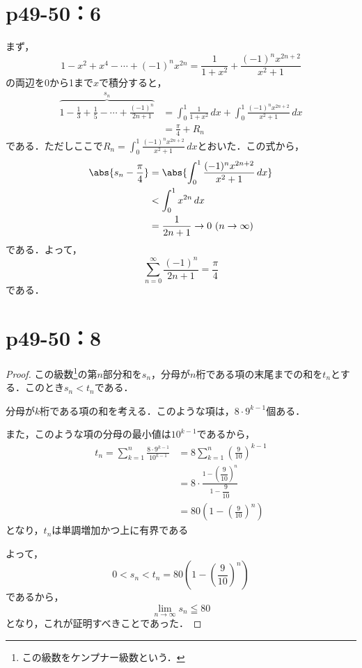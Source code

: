 \documentclass[a4paper,10pt,fleqn]{ltjsarticle}
\begin{document}
    \section*{p49-50：6}
    \begin{tleftbar}
        まず，
        \[
             1-x^2+x^4-\cdots+(-1)^n x^{2n} =\frac{1}{1+x^2} +\frac{(-1)^n x^{2n+2}}{x^2+1}
        \]
    の両辺を0から1まで$x$で積分すると，
    \begin{align*}
       \overbrace{1-\frac{1}{3}+\frac{1}{5}-\cdots+\frac{(-1)^n}{2n+1}}^{s_n} &=\int_{0}^{1} \frac{1}{1+x^2} \, dx +\int_{0}^{1}\frac{(-1)^n x^{2n+2}}{x^2+1}  \, dx \\
    & = \frac{\pi}{4} + R_n
    \end{align*}
    である．ただしここで$R_n =\int_{0}^{1}\frac{(-1)^n x^{2n+2}}{x^2+1} \, dx$とおいた．この式から，
    \begin{align*}
      \abs{s_n -\frac{\pi}{4}  } & = \abs{\int_{0}^{1}\frac{(-1)^n x^{2n+2}}{x^2+1} \, dx } \\
       & < \int_{0}^{1} x^{2n} \, dx \\
       & =\frac{1}{2n+1} \to 0 ~(n \to \infty)
    \end{align*}
    である．よって，
    \[
        \sum_{n=0}^{\infty} \frac{(-1)^n}{2n+1} =\frac{\pi}{4}
    \]
    である．
    \end{tleftbar}

    \newpage 

    \section*{p49-50：8}

    \begin{tleftbar}
        \begin{proof}
        この級数\footnote{この級数をケンプナー級数という．}の第$n$部分和を$s_n$，分母が$n$桁である項の末尾までの和を$t_n$とする．このとき$s_n < t_n$である．

        分母が$k$桁である項の和を考える．このような項は，$8 \cdot 9^{k-1}$個ある．
        
        また，このような項の分母の最小値は$10^{k-1}$であるから，
        \begin{align*} 
            t_n = \sum_{k=1}^{n} \frac{8 \cdot 9^{k-1}}{10^{k-1}} &= 8 \sum_{k=1}^{n} \left(\frac{9}{10}\right)^{k-1} \\
            &= 8 \cdot \frac{1-\left(\dfrac{9}{10}\right)^n}{1-\dfrac{9}{10}} \\
            & = 80 \left(1-\left(\frac{9}{10}\right)^n\right)
        \end{align*}
        となり，$t_n$は単調増加かつ上に有界である

        よって，
        \[
            0 < s_n < t_n = 80 \left(1-\left(\frac{9}{10}\right)^n\right)
        \]
        であるから，
        \[
            \lim_{n \to \infty} s_n \leqq 80
        \]
        となり，これが証明すべきことであった．
    \end{proof}
\end{tleftbar}
\end{document}
